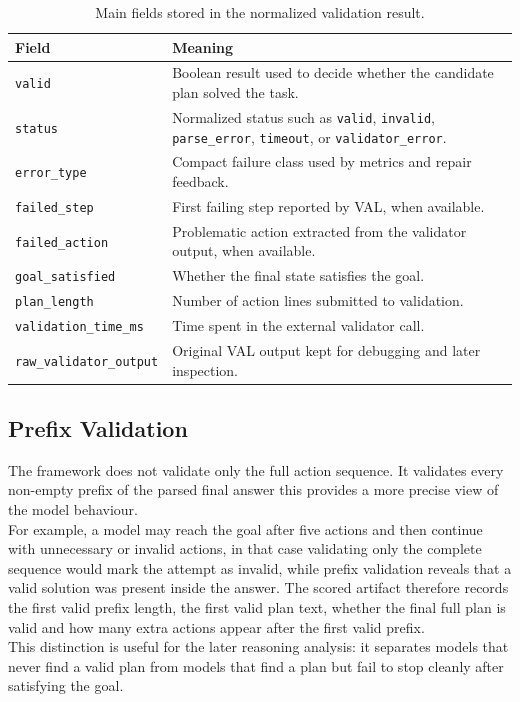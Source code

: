 \begin{table}[H]
\centering
\renewcommand{\arraystretch}{1.2}
\begin{tabularx}{\textwidth}{lX}
\toprule
\textbf{Field} & \textbf{Meaning} \\
\midrule
\texttt{valid} & Boolean result used to decide whether the candidate plan solved the task. \\
\texttt{status} & Normalized status such as \texttt{valid}, \texttt{invalid}, \texttt{parse\_error}, \texttt{timeout}, or \texttt{validator\_error}. \\
\texttt{error\_type} & Compact failure class used by metrics and repair feedback. \\
\texttt{failed\_step} & First failing step reported by VAL, when available. \\
\texttt{failed\_action} & Problematic action extracted from the validator output, when available. \\
\texttt{goal\_satisfied} & Whether the final state satisfies the goal. \\
\texttt{plan\_length} & Number of action lines submitted to validation. \\
\texttt{validation\_time\_ms} & Time spent in the external validator call. \\
\texttt{raw\_validator\_output} & Original VAL output kept for debugging and later inspection. \\
\bottomrule
\end{tabularx}
\caption{Main fields stored in the normalized validation result.}
\label{tab:validation-result-fields}
\end{table}

\subsection{Prefix Validation}

The framework does not validate only the full action sequence. It validates
every non-empty prefix of the parsed final answer this provides a more precise
view of the model behaviour.\\
For example, a model may reach the goal after five actions and then continue
with unnecessary or invalid actions, in that case validating only the complete
sequence would mark the attempt as invalid, while prefix validation reveals that
a valid solution was present inside the answer. The scored artifact therefore
records the first valid prefix length, the first valid plan text, whether the
final full plan is valid and how many extra actions appear after the first
valid prefix.\\
This distinction is useful for the later reasoning analysis: it separates models
that never find a valid plan from models that find a plan but fail to stop cleanly
after satisfying the goal.

